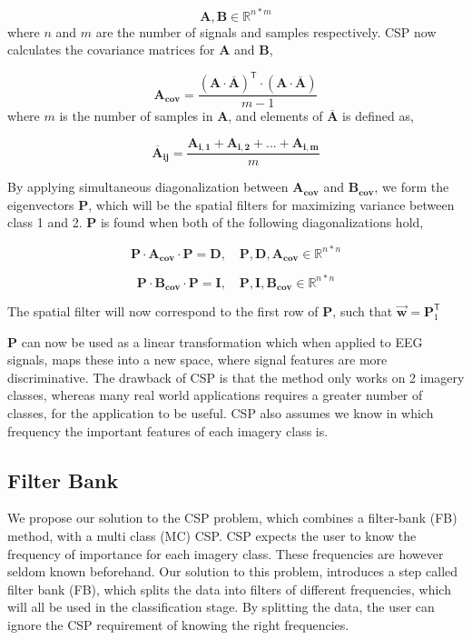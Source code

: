 \begin{equation}
\label{eq:csp_data}
\pmb{A}, \pmb{B} \in \mathbb{R}^{n*m}
\end{equation}
where $n$ and $m$ are the number of signals and samples respectively. CSP now calculates the covariance matrices for $\pmb{A}$ and $\pmb{B}$,

\begin{equation}
\label{eq:covariance_matrice}
\pmb{A_{cov}} = \frac{(\pmb{A} \cdot \overline{\pmb{A}})^\mathsf{T}  \cdot (\pmb{A} \cdot \overline{\pmb{A}})}{m - 1}
\end{equation}
where $m$ is the number of samples in $\pmb{A}$, and elements of $\overline{\pmb{A}}$ is defined as,

\begin{equation}
\label{eq:a_bar}
\pmb{\overline{A}_{ij}} = \frac{\pmb{A_{i,1}} + \pmb{A_{i,2}} + ... + \pmb{A_{i,m}}}{m}
\end{equation}

By applying simultaneous diagonalization between $\pmb{A_{cov}}$ and $\pmb{B_{cov}}$, we form the eigenvectors $\pmb{P}$, which will be the spatial filters for maximizing variance between class 1 and 2. $\pmb{P}$ is found when both of the following diagonalizations hold, 

\begin{equation}
\label{eq:diagonalization_A}
\pmb{P} \cdot \pmb{A_{cov}} \cdot \pmb{P} = \pmb{D}, \quad \pmb{P}, \pmb{D}, \pmb{A_{cov}} \in \mathbb{R}^{n*n}
\end{equation}

\begin{equation}
\label{eq:diagonalization_B}
\pmb{P} \cdot \pmb{B_{cov}} \cdot \pmb{P} = \pmb{I}, \quad \pmb{P}, \pmb{I}, \pmb{B_{cov}} \in \mathbb{R}^{n*n}
\end{equation}

The spatial filter will now correspond to the first row of $\pmb{P}$, such that $\pmb{\vec{w}} = \pmb{P}^\mathsf{T}_{1}$ 

$\pmb{P}$ can now be used as a linear transformation which when applied to EEG signals, maps these into a new space, where signal features are more discriminative. The drawback of CSP is that the method only works on 2 imagery classes, whereas many real world applications requires a greater number of classes, for the application to be useful. CSP also assumes we know in which frequency the important features of each imagery class is.

\subsection{Filter Bank}
We propose our solution to the CSP problem, which combines a filter-bank (FB) method, with a multi class (MC) CSP. CSP expects the user to know the frequency of importance for each imagery class. These frequencies are however seldom known beforehand. Our solution to this problem, introduces a step called filter bank (FB), which splits the data into filters of different frequencies, which will all be used in the classification stage. By splitting the data, the user can ignore the CSP requirement of knowing the right frequencies.

